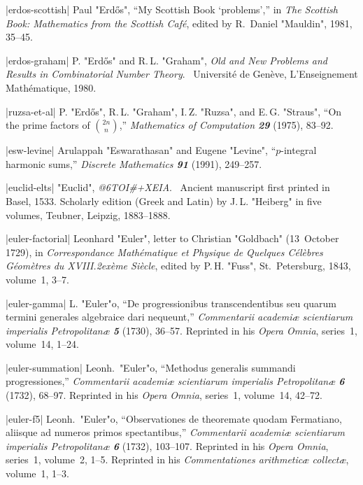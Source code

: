 \bib|erdos-scottish|%
Paul "Erd\H os", ``My Scottish Book `problems','' in {\sl The Scottish Book:
Mathematics from the Scottish Caf\'e\/},
edited by R.~Daniel "Mauldin", 1981, \hbox{35--45}.

\bib|erdos-graham|%
P. "Erd\H os" and R.\,L. "Graham", {\sl Old and New Problems and Results in
Combinatorial Number Theory}. \ Universit\'e de Gen\`eve, L'Enseignement
Math\'ematique, 1980.

\bib|ruzsa-et-al|%
P. "Erd\H os", R.\,L. "Graham", I.\,Z. "Ruzsa", and E.\,G. "Straus", ``On the
prime factors of $2n\choose n$,''
{\sl Mathematics of Computation\/ \bf29} (1975), 83--92.

\bib|esw-levine|%
Arulappah "Eswarathasan" and Eugene "Levine", ``$p$-integral harmonic sums,''
{\sl Discrete Mathematics\/ \bf91} (1991), 249--257.

\bib|euclid-elts|%
"Euclid", {\sl @6TOI#+XEIA}.
 \ Ancient manuscript first printed in Basel, 1533.
Scholarly edition (Greek and Latin) by J.\,L. "Heiberg" in five volumes,
Teubner, Leipzig, 1883--1888.

\bib|euler-factorial|%
Leonhard "Euler", letter to Christian "Goldbach" (13~October 1729), in
{\sl Correspondance Math\'ematique et Physique de Quelques C\'el\`ebres
G\'eom\`etres du XVIII\kern1pt\raise.2ex\hbox{\`eme} Si\`ecle},
 edited by P.\,H. "Fuss", St.~Petersburg, 1843, volume~1, 3--7.

\bib|euler-gamma|%
L. "Euler"o, ``De progressionibus transcendentibus seu quarum termini
generales algebraice dari nequeunt,''
{\sl Commentarii academ\-i{\ae} scientiarum imperialis Petropolitan{\ae}
\bf5} (1730), 36--57.
Re\-printed in his {\sl Opera Omnia}, series~1, volume~14, 1--24.

\bib|euler-summation|%
Leonh.~"Euler"o, ``Methodus generalis summandi progressiones,''
{\sl Commentarii academ\-i{\ae} scientiarum imperialis Petropolitan{\ae}
\bf6} (1732), 68--97.
Re\-printed in his {\sl Opera Omnia}, series~1, volume~14, 42--72.

\bib|euler-f5|%
Leonh.~"Euler"o, ``Observationes de theoremate quodam Fermatiano, aliisque
ad numeros primos spectantibus,''
{\sl Commentarii academ\-i{\ae} scientiarum imperialis Petropolitan{\ae}
\bf6} (1732), 103--107.
Re\-printed in his {\sl Opera Omnia}, series~1, volume~2, 1--5.
Reprinted in his {\sl Commentationes arithmetic{\ae} collect{\ae}},
volume~1, 1--3.


